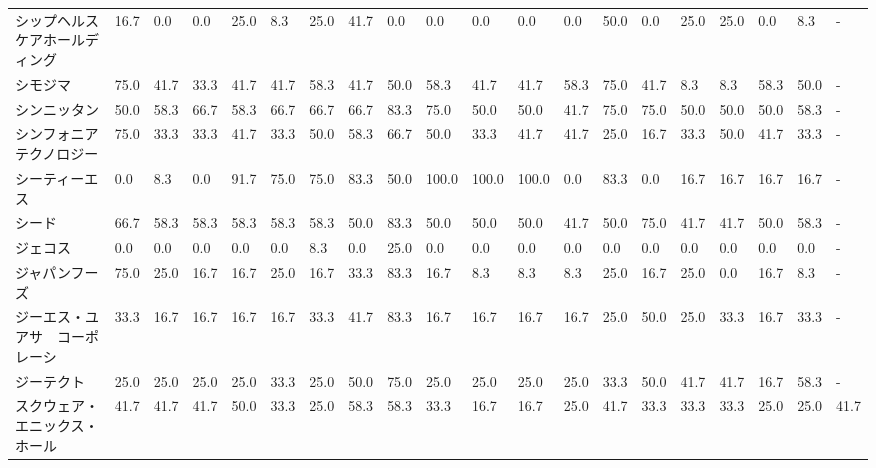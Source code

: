 \begin{tabular}{llllllllllllllllllll}
シップヘルスケアホールディング &   16.7 &    0.0 &       0.0 &      25.0 &        8.3 &   25.0 &   41.7 &    0.0 &     0.0 &     0.0 &    0.0 &   0.0 &   50.0 &     0.0 &    25.0 &  25.0 &   0.0 &   8.3 &     - \\
シモジマ            &   75.0 &   41.7 &      33.3 &      41.7 &       41.7 &   58.3 &   41.7 &   50.0 &    58.3 &    41.7 &   41.7 &  58.3 &   75.0 &    41.7 &     8.3 &   8.3 &  58.3 &  50.0 &     - \\
シンニッタン          &   50.0 &   58.3 &      66.7 &      58.3 &       66.7 &   66.7 &   66.7 &   83.3 &    75.0 &    50.0 &   50.0 &  41.7 &   75.0 &    75.0 &    50.0 &  50.0 &  50.0 &  58.3 &     - \\
シンフォニア　テクノロジー   &   75.0 &   33.3 &      33.3 &      41.7 &       33.3 &   50.0 &   58.3 &   66.7 &    50.0 &    33.3 &   41.7 &  41.7 &   25.0 &    16.7 &    33.3 &  50.0 &  41.7 &  33.3 &     - \\
シーティーエス         &    0.0 &    8.3 &       0.0 &      91.7 &       75.0 &   75.0 &   83.3 &   50.0 &   100.0 &   100.0 &  100.0 &   0.0 &   83.3 &     0.0 &    16.7 &  16.7 &  16.7 &  16.7 &     - \\
シード             &   66.7 &   58.3 &      58.3 &      58.3 &       58.3 &   58.3 &   50.0 &   83.3 &    50.0 &    50.0 &   50.0 &  41.7 &   50.0 &    75.0 &    41.7 &  41.7 &  50.0 &  58.3 &     - \\
ジェコス            &    0.0 &    0.0 &       0.0 &       0.0 &        0.0 &    8.3 &    0.0 &   25.0 &     0.0 &     0.0 &    0.0 &   0.0 &    0.0 &     0.0 &     0.0 &   0.0 &   0.0 &   0.0 &     - \\
ジャパンフーズ         &   75.0 &   25.0 &      16.7 &      16.7 &       25.0 &   16.7 &   33.3 &   83.3 &    16.7 &     8.3 &    8.3 &   8.3 &   25.0 &    16.7 &    25.0 &   0.0 &  16.7 &   8.3 &     - \\
ジーエス・ユアサ　コーポレーシ &   33.3 &   16.7 &      16.7 &      16.7 &       16.7 &   33.3 &   41.7 &   83.3 &    16.7 &    16.7 &   16.7 &  16.7 &   25.0 &    50.0 &    25.0 &  33.3 &  16.7 &  33.3 &     - \\
ジーテクト           &   25.0 &   25.0 &      25.0 &      25.0 &       33.3 &   25.0 &   50.0 &   75.0 &    25.0 &    25.0 &   25.0 &  25.0 &   33.3 &    50.0 &    41.7 &  41.7 &  16.7 &  58.3 &     - \\
スクウェア・エニックス・ホール &   41.7 &   41.7 &      41.7 &      50.0 &       33.3 &   25.0 &   58.3 &   58.3 &    33.3 &    16.7 &   16.7 &  25.0 &   41.7 &    33.3 &    33.3 &  33.3 &  25.0 &  25.0 &  41.7 \\

\end{tabular}
